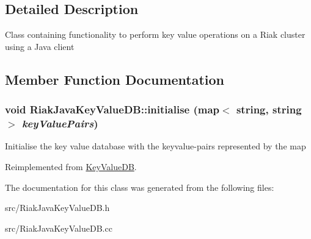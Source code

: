\subsection{Detailed Description}
Class containing functionality to perform key value operations on a Riak cluster using a Java client 

\subsection{Member Function Documentation}
\hypertarget{classRiakJavaKeyValueDB_aa7e3df85b19f2c3a936a7282f8ddb98f}{
\subsubsection[{initialise}]{\setlength{\rightskip}{0pt plus 5cm}void RiakJavaKeyValueDB::initialise (map$<$ string, string $>$ {\em keyValuePairs})}}
\label{classRiakJavaKeyValueDB_aa7e3df85b19f2c3a936a7282f8ddb98f}
Initialise the key value database with the keyvalue-\/pairs represented by the map 

Reimplemented from \hyperlink{classKeyValueDB_aebd32f35aa2c11ac0d071bd8307fc521}{KeyValueDB}.

The documentation for this class was generated from the following files:\begin{DoxyCompactItemize}
\item 
src/RiakJavaKeyValueDB.h\item 
src/RiakJavaKeyValueDB.cc\end{DoxyCompactItemize}
